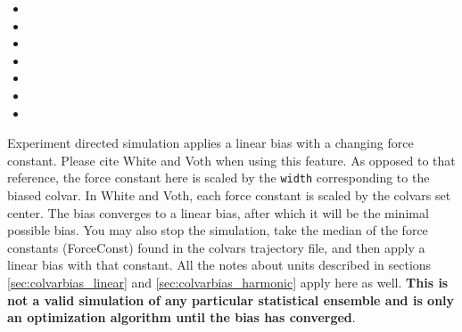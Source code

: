 \begin{itemize}
\item {}
\item {}
\item {}
\item {}
\item {}
\item {}
\item {}

\end{itemize}


Experiment directed simulation applies a linear bias with a changing
force constant. Please cite White and Voth \cite{White2014} when
using this feature. As opposed to that reference, the force constant here is scaled
by the \texttt{width} corresponding to the biased colvar. In White and
Voth, each force constant is scaled by the colvars set center. The
bias converges to a linear bias, after which it will be the minimal
possible bias. You may also stop the simulation, take the median of
the force constants (ForceConst) found in the colvars trajectory file,
and then apply a linear bias with that constant. All the notes about
units described in sections \ref{sec:colvarbias_linear}
and \ref{sec:colvarbias_harmonic} apply here as well. {\bf This is not
a valid simulation of any particular statistical ensemble and is only
an optimization algorithm until the bias has converged}.

